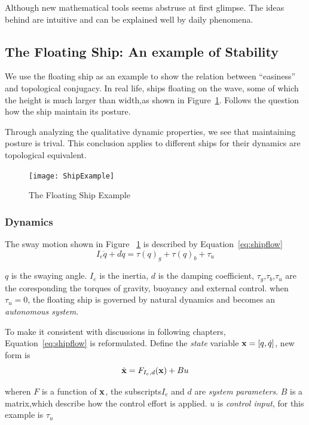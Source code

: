 Although new mathematical tools seems abstruse at first glimpse.
The ideas behind are intuitive and can be explained well by daily phenomena.



\subsection{The Floating Ship: An example of Stability}
We use the floating ship as an example to show the relation between ``easiness'' and topological conjugacy.
In real life, ships floating on the wave, some of which the height is much larger than width,as shown in Figure~\ref{fig:ShipFloating}.
Follows the  question how the ship maintain its posture.

Through analyzing the qualitative dynamic properties, we see that maintaining posture is trival.
This conclusion applies to different ships for their dynamics are topological equivalent.


\begin{figure}[!htbp]
  \begin{center}
    \texttt{[image: ShipExample]}
    \caption{The Floating Ship Example}
    \label{fig:ShipFloating}
  \end{center}
\end{figure}

\subsubsection*{Dynamics}
The sway motion shown in Figure ~\ref{fig:ShipFloating} is described by Equation~\ref{eq:shipflow}
\begin{equation}
\label{eq:shipflow}
I_{e}\ddot{q}+d\dot{q}=\tau(q)_{g}+\tau(q)_{b}+\tau_{u}
\end{equation}

$q$ is the swaying angle.
$I_{e}$ is the inertia,  
$d$ is the damping coefficient,
$\tau_{g}$,$\tau_{b}$,$\tau_{u}$ are the coresponding the torques of gravity, buoyancy and external control.
when $\tau_{u}=0$,  the floating ship is governed by natural dynamics and becomes an \emph{autonomous system}.

To make it consistent with discussions in following chapters, Equation~\ref{eq:shipflow} is reformulated.
Define the \emph{state} variable $\mathbf{x}=[q,\dot{q}]$, new form is
\[
\dot{\mathbf{x}}=F_{I_e,d}(\mathbf{x})+Bu
\]

wheren 
$F$ is a function of $\mathbf{x}$, the subscripts$I_e$ and $d$ are \emph{system parameters}.
$B$ is a matrix,which describe how the control effort is applied.
$u$ is \emph{control input}, for this example is $\tau_{u}$



